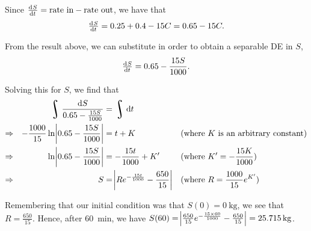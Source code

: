 \documentclass[a4paper]{article}
\DeclareMathOperator*{\rint}{\scalerel*{\rotatebox{17}{$\!\int\!$}}{\int}}
\begin{document}
Since $ \od{S}{t} = \text{rate in} - \text{rate out} $, we have that
\begin{displaymath}
  \od{S}{t} = 0.25 + 0.4 - 15C = 0.65 - 15C.
\end{displaymath}

From the result above, we can substitute in order to obtain a separable DE in $ S $,
\begin{displaymath}
  \od{S}{t} = 0.65 - \frac{15S}{1000}.
\end{displaymath}

Solving this for $ S $, we find that
\begin{align*}
              && \rint \frac{\dif{S}}{0.65 - \frac{15S}{1000}}      &= \rint \dif{t} &&\\
  \Rightarrow &&-\frac{1000}{15} \ln{\abs{0.65 - \frac{15S}{1000}}} &= t + K && \text{(where $ K $ is an arbitrary constant)}  \\
  \Rightarrow &&\ln{\abs{0.65 - \frac{15S}{1000}}}                  &= -\frac{15t}{1000} + K' && \text{(where $ K' = -\frac{15K}{1000}$)} \\
  \Rightarrow && S                                                  &= \abs{Re^{-\frac{15t}{1000}} - \frac{650}{15}} && \text{(where $ R = \frac{1000}{15}e^{K'} $)}
\end{align*}

Remembering that our initial condition was that $ S(0) = \SI{0}{\kilo\gram} $, we see that $ R = \frac{650}{15} $. Hence, after \SI{60}{\minute},
we have $ S(60) = \abs{\frac{650}{15}e^{-\frac{15\times 60}{1000}} - \frac{650}{15}} = \SI{25.715}{\kilo\gram}$.
\end{document}

